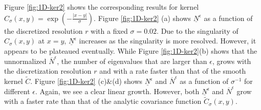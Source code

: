 \documentclass[11pt]{amsart}
\begin{document}


Figure \ref{fig:1D-ker2} shows the corresponding results for kernel $\hat{C}_{\sigma}(x,y)=\exp(-\frac{|x-y|}{\sigma})$. Figure \ref{fig:1D-ker2} (a) shows $\underline{N}^{\epsilon}$ as a function of the discretized resolution $r$ with a fixed $\sigma=0.02$. Due to the singularity of $\hat{C}_{\sigma}(x,y)$ at $x=y$, $\underline{N}^{\epsilon}$ increases as the singularity is more resolved. However, it appears to be plateaued eventually.  While Figure \ref{fig:1D-ker2}(b) shows that the unnormalized $\overline{N}^{\epsilon}$, the number of eigenvalues that are larger than $\epsilon$, grows with the discretization resolution $r$ and with a rate faster than that of the smooth kernel $\tilde{C}$. 
Figure \ref{fig:1D-ker2} (c)\&(d) shows $\underline{N}^{\epsilon}$ and $\overline{N}^{\epsilon}$ as a function of $\sigma^{-1}$ for different $\epsilon$. Again, we see a clear linear growth. However,  both $\underline{N}^{\epsilon}$ and $\overline{N}^{\epsilon}$ grow with a faster rate than that of the analytic covariance function $\tilde{C}_{\sigma}(x,y)$.
\end{document}
